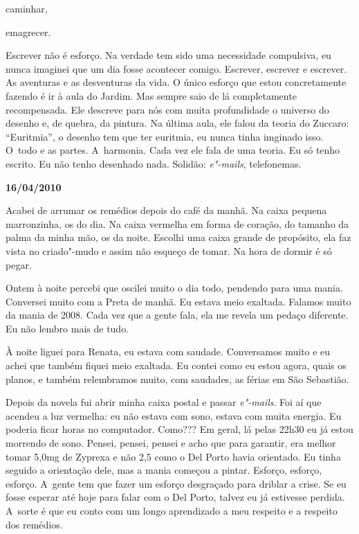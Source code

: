 caminhar,

emagrecer.

Escrever não é esforço. Na verdade tem sido uma necessidade compulsiva,
eu nunca imaginei que um dia fosse acontecer comigo. Escrever, escrever
e escrever. As aventuras e as desventuras da vida. O único esforço que
estou concretamente fazendo é ir à aula do Jardim. Mas sempre saio de lá
completamente recompensada. Ele descreve para nós com muita profundidade
o universo do desenho e, de quebra, da pintura. Na última aula, ele
falou da teoria do Zuccaro: ``Euritmia'', o desenho tem que ter
euritmia, eu nunca tinha imginado isso. O~todo e as partes. A~harmonia.
Cada vez ele fala de uma teoria. Eu só tenho escrito. Eu não tenho
desenhado nada. Solidão: \emph{e"-mails}, telefonemas.

\begin{center}\asterisc{}\end{center}

 \begin{flushright}\textbf{16/04/2010}\end{flushright}


Acabei de arrumar os remédios depois do café da manhã. Na caixa pequena
marronzinha, os do dia. Na caixa vermelha em forma de coração, do
tamanho da palma da minha mão, os da noite. Escolhi uma caixa grande de
propósito, ela faz vista no criado"-mudo e assim não esqueço de tomar. Na
hora de dormir é só pegar.

Ontem à noite percebi que oscilei muito o dia todo, pendendo para uma
mania. Conversei muito com a Preta de manhã. Eu estava meio exaltada.
Falamos muito da mania de 2008. Cada vez que a gente fala, ela me revela
um pedaço diferente. Eu não lembro mais de tudo.

À noite liguei para Renata, eu estava com saudade. Conversamos muito e
eu achei que também fiquei meio exaltada. Eu contei como eu estou agora,
quais os planos, e também relembramos muito, com saudades, as férias em
São Sebastião.

Depois da novela fui abrir minha caixa postal e passar \emph{e"-mails}.
Foi aí que acendeu a luz vermelha: eu não estava com sono, estava com
muita energia. Eu poderia ficar horas no computador. Como??? Em geral,
lá pelas 22h30 eu já estou morrendo de sono. Pensei, pensei, pensei e
acho que para garantir, era melhor tomar 5,0mg de Zyprexa e não 2,5 como
o Del Porto havia orientado. Eu tinha seguido a orientação dele, mas a
mania começou a pintar. Esforço, esforço, esforço. A~gente tem que fazer
um esforço desgraçado para driblar a crise. Se eu fosse esperar até hoje
para falar com o Del Porto, talvez eu já estivesse perdida. A~sorte é
que eu conto com um longo aprendizado a meu respeito e a respeito dos
remédios.

